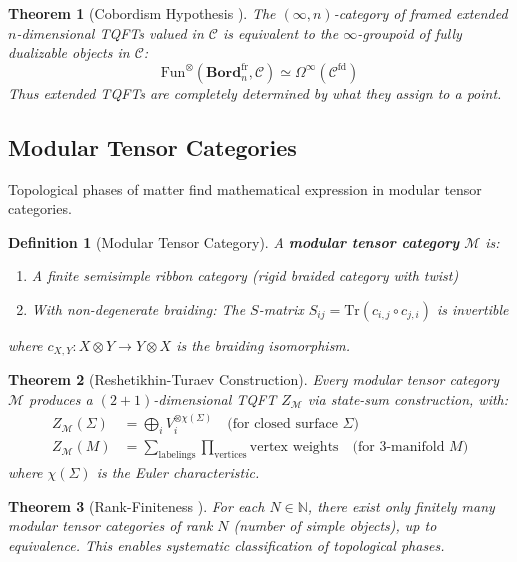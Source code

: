 \documentclass[11pt,a4paper]{article}
\newtheorem{theorem}{Theorem}[section]
\newtheorem{definition}{Definition}[section]
\theoremstyle{remark}
\theoremstyle{definition}
\begin{document}
\begin{theorem}[Cobordism Hypothesis \cite{Lurie2009}]
The $(\infty, n)$-category of framed extended $n$-dimensional TQFTs valued in $\mathcal{C}$ is equivalent to the $\infty$-groupoid of fully dualizable objects in $\mathcal{C}$:
\begin{equation}
\text{Fun}^\otimes(\textbf{Bord}_n^{\text{fr}}, \mathcal{C}) \simeq \Omega^\infty(\mathcal{C}^{\text{fd}})
\end{equation}
Thus extended TQFTs are completely determined by what they assign to a point.
\end{theorem}

\subsection{Modular Tensor Categories}

Topological phases of matter find mathematical expression in modular tensor categories.

\begin{definition}[Modular Tensor Category]
A \textbf{modular tensor category} $\mathcal{M}$ is:
\begin{enumerate}[label=(\roman*)]
\item A finite semisimple ribbon category (rigid braided category with twist)
\item With non-degenerate braiding: The $S$-matrix $S_{ij} = \text{Tr}(c_{i,j} \circ c_{j,i})$ is invertible
\end{enumerate}
where $c_{X,Y}: X \otimes Y \to Y \otimes X$ is the braiding isomorphism.
\end{definition}

\begin{theorem}[Reshetikhin-Turaev Construction]
Every modular tensor category $\mathcal{M}$ produces a $(2+1)$-dimensional TQFT $Z_{\mathcal{M}}$ via state-sum construction, with:
\begin{align}
Z_{\mathcal{M}}(\Sigma) &= \bigoplus_{i} V_i^{\otimes \chi(\Sigma)} \quad \text{(for closed surface $\Sigma$)} \\
Z_{\mathcal{M}}(M) &= \sum_{\text{labelings}} \prod_{\text{vertices}} \text{vertex weights} \quad \text{(for 3-manifold $M$)}
\end{align}
where $\chi(\Sigma)$ is the Euler characteristic.
\end{theorem}

\begin{theorem}[Rank-Finiteness \cite{RankFiniteness2016}]
For each $N \in \mathbb{N}$, there exist only finitely many modular tensor categories of rank $N$ (number of simple objects), up to equivalence. This enables systematic classification of topological phases.
\end{theorem}
\end{document}
